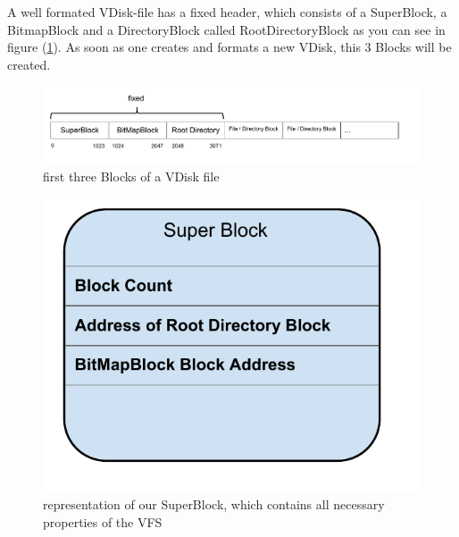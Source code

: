 \documentclass[a4paper,12pt]{article}
\begin{document}
A well formated VDisk-file has a fixed header, which consists of a SuperBlock, a BitmapBlock and a DirectoryBlock called RootDirectoryBlock as you can see in figure (\ref{vdiskheader}). As soon as one creates and formats a new VDisk, this 3 Blocks will be created.\\



\begin{figure}[h]
\begin{center}
\includegraphics[scale=0.6]{images/VDiskHeader.pdf}
\caption{first three Blocks of a VDisk file}
\label{vdiskheader}
\end{center}
\end{figure}

\begin{figure}[h]
\begin{center}
\includegraphics[scale=0.5]{images/SuperBlock.pdf}
\caption{representation of our SuperBlock, which contains all necessary properties of the VFS}
\label{superblock}
\end{center}
\end{figure}
\end{document}
